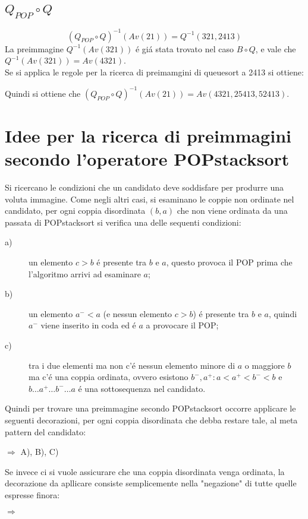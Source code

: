 \subsection*{$Q_{POP}\circ{Q}$}
$$(Q_{POP}\circ{Q})^{-1}(Av(21)) = Q^{-1}(321, 2413)$$
La preimmagine $Q^{-1}(Av(321))$ \'e gi\'a stata trovato nel caso $B\circ{Q}$, e vale che $Q^{-1}(Av(321)) = Av(4321)$.\\
Se si applica le regole per la ricerca di preimamgini di queuesort a 2413 si ottiene:
\begin{center}\end{center}
Quindi si ottiene che $(Q_{POP}\circ{Q})^{-1}(Av(21)) = Av(4321, 25413, 52413)$.
\section*{Idee per la ricerca di preimmagini secondo l'operatore POPstacksort}
Si ricercano le condizioni che un candidato deve soddisfare per produrre una voluta immagine. Come negli altri casi, si esaminano le coppie non ordinate nel candidato, per ogni coppia disordinata $(b,a)$ che non viene ordinata da una passata di POPstacksort si verifica una delle sequenti condizioni:
\begin{description}
	\item[a)] un elemento $c>b$ \'e presente tra $b$ e $a$, questo provoca il POP prima che l'algoritmo arrivi ad esaminare $a$;
	\item[b)] un elemento $a^-<a$ (e nessun elemento $c>b$) \'e presente tra $b$ e $a$, quindi $a^-$ viene inserito in coda ed \'e $a$ a provocare il POP;
	\item[c)] tra i due elementi ma non c'\'e nessun elemento minore di $a$ o maggiore $b$ ma c'\'e una coppia ordinata, ovvero esistono ${b^-,a^+}:a<a^+<b^-<b$ e $b\dots{a^+}\dots{b^-}\dots{a}$ \'e una sottosequenza nel candidato.
\end{description}
Quindi per trovare una preimmagine secondo POPstacksort occorre applicare le seguenti decorazioni, per ogni coppia disordinata che debba restare tale, al meta pattern del candidato:
\begin{center}
$\Rightarrow$
A),
B),
C)
\end{center}
Se invece ci si vuole assicurare che una coppia disordinata venga ordinata, la decorazione da apllicare consiste semplicemente nella "negazione" di tutte quelle espresse finora:
\begin{center}
$\Rightarrow$
\end{center}
